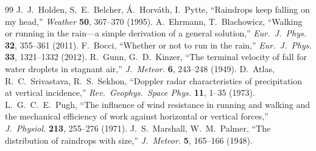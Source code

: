\documentclass[11pt,a4paper]{article}
\begin{document}
\begin{thebibliography}{99}
 J.~J.~Holden, S.~E.~Belcher, \'A.~Horv\'ath, I.~Pytte, ``Raindrops keep falling on my head,'' \emph{Weather} \textbf{50}, 367--370 (1995).
 A.~Ehrmann, T.~Blachowicz, ``Walking or running in the rain---a simple derivation of a general solution,'' \emph{Eur.\ J.\ Phys.} \textbf{32}, 355--361 (2011).
 F.~Bocci, ``Whether or not to run in the rain,'' \emph{Eur.\ J.\ Phys.} \textbf{33}, 1321--1332 (2012).
 R.~Gunn, G.~D.~Kinzer, ``The terminal velocity of fall for water droplets in stagnant air,'' \emph{J.\ Meteor.} \textbf{6}, 243--248 (1949).
 D.~Atlas, R.~C.~Srivastava, R.~S.~Sekhon, ``Doppler radar characteristics of precipitation at vertical incidence,'' \emph{Rev.\ Geophys.\ Space Phys.} \textbf{11}, 1--35 (1973).
 L.~G.~C.~E.~Pugh, ``The influence of wind resistance in running and walking and the mechanical efficiency of work against horizontal or vertical forces,'' \emph{J.\ Physiol.} \textbf{213}, 255--276 (1971).
 J.~S.~Marshall, W.~M.~Palmer, ``The distribution of raindrops with size,'' \emph{J.\ Meteor.} \textbf{5}, 165--166 (1948).
\end{thebibliography}
\end{document}
